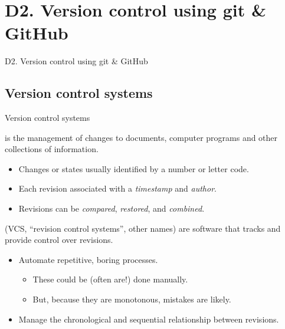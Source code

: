 \documentclass[12pt,aspectratio=169]{beamer}
\begin{document}
\section{D2. Version control using git \& GitHub}
\begin{frame}{D2. Version control using git \& GitHub}
  \tableofcontents[hideothersubsections]
\end{frame}

\subsection{Version control systems}
\begin{frame}{Version control systems}

   is the management of changes to documents, computer programs and other collections of information.

  \begin{itemize}
    \item Changes or states usually identified by a number or letter code.
    \item Each revision associated with a \emph{timestamp} and \emph{author}.
    \item Revisions can be \emph{compared}, \emph{restored}, and \emph{combined}.
  \end{itemize}

  \bigskip
   (VCS, “revision control systems”, other names) are software that tracks and provide control over revisions.

  \begin{itemize}
    \item Automate repetitive, boring processes.
          \begin{itemize}
            \item These could be (often are!) done manually.
            \item But, because they are monotonous, mistakes are likely.
          \end{itemize}
    \item Manage the chronological and sequential relationship between revisions.
  \end{itemize}

\end{frame}
\end{document}
